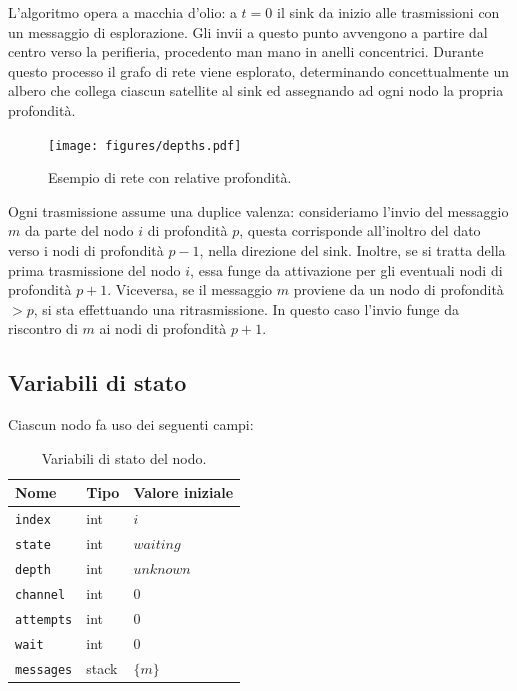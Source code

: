 \documentclass[a4paper,12pt]{article}
\theoremstyle{definition}
\begin{document}
L'algoritmo opera a macchia d'olio: a $t=0$ il sink da inizio alle trasmissioni con un messaggio di esplorazione. Gli invii a questo punto avvengono a partire dal centro verso la perifieria, procedento man mano in anelli concentrici. Durante questo processo il grafo di rete viene esplorato, determinando concettualmente un albero che collega ciascun satellite al sink ed assegnando ad ogni nodo la propria profondità.

\begin{figure}[H]
\centering
\texttt{[image: figures/depths.pdf]}
\caption{Esempio di rete con relative profondità.}
\end{figure}

Ogni trasmissione assume una duplice valenza: consideriamo l'invio del messaggio $m$ da parte del nodo $i$ di profondità $p$, questa corrisponde all'inoltro del dato verso i nodi di profondità $p-1$, nella direzione del sink. Inoltre, se si tratta della prima trasmissione del nodo $i$, essa funge da attivazione per gli eventuali nodi di profondità $p+1$. Viceversa, se il messaggio $m$ proviene da un nodo di profondità $> p$, si sta effettuando una ritrasmissione. In questo caso l'invio funge da riscontro di $m$ ai nodi di profondità $p+1$.

\subsection{Variabili di stato}

Ciascun nodo fa uso dei seguenti campi:

\begin{table}[H]
\centering
\begin{tabular}{| l | l | l |}
\multicolumn{1}{l}{Nome} &
\multicolumn{1}{l}{Tipo} &
\multicolumn{1}{l}{Valore iniziale} \\ \hline
\texttt{index} & int & $i$ \\ \hline
\texttt{state} & int & $waiting$ \\ \hline
\texttt{depth} & int & $unknown$ \\ \hline
\texttt{channel} & int & $0$ \\ \hline
\texttt{attempts} & int & $0$ \\ \hline
\texttt{wait} & int & $0$ \\ \hline
\texttt{messages} & stack & $\{m\}$ \\ \hline
\end{tabular}
\caption{Variabili di stato del nodo.}
\end{table}
\end{document}
